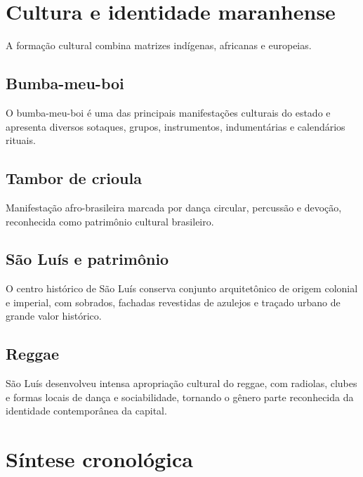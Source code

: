 \section{Cultura e identidade maranhense}

A formação cultural combina matrizes indígenas, africanas e europeias.

\subsection{Bumba-meu-boi}

O bumba-meu-boi é uma das principais manifestações culturais do estado e apresenta diversos sotaques, grupos, instrumentos, indumentárias e calendários rituais.

\subsection{Tambor de crioula}

Manifestação afro-brasileira marcada por dança circular, percussão e devoção, reconhecida como patrimônio cultural brasileiro.

\subsection{São Luís e patrimônio}

O centro histórico de São Luís conserva conjunto arquitetônico de origem colonial e imperial, com sobrados, fachadas revestidas de azulejos e traçado urbano de grande valor histórico.

\subsection{Reggae}

São Luís desenvolveu intensa apropriação cultural do reggae, com radiolas, clubes e formas locais de dança e sociabilidade, tornando o gênero parte reconhecida da identidade contemporânea da capital.

\section{Síntese cronológica}


